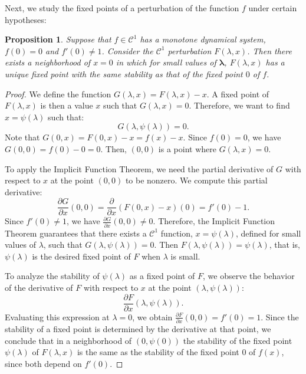 \documentclass[12pt,a4paper]{report}
\newtheorem{proposicion}{Proposition}[section]
\theoremstyle{definition}
\begin{document}
Next, we study the fixed points of a perturbation of the function $f$ under certain hypotheses:

\begin{proposicion}
    
Suppose that $f \in \mathcal{C}^1$ has a monotone dynamical system, $f(0)=0$ and $f'(0) \neq 1$. Consider the $\mathcal{C}^1$ perturbation $F(\lambda,x)$.
Then there exists a neighborhood of $x = 0$ in which for small values of $\mathbf{\lambda}$, $F(\lambda,x)$ has a unique fixed point with the same stability as that of the fixed point $0$ of $f$.

\end{proposicion}

\begin{proof}

We define the function \( G(\lambda, x) = F(\lambda, x) - x \). A fixed point of \( F(\lambda, x) \) is then a value \( x \) such that \( G(\lambda, x) = 0 \). Therefore, we want to find \( x = \psi(\lambda) \) such that:
\[
G(\lambda, \psi(\lambda)) = 0.
\]
Note that \( G(0, x) = F(0, x) - x = f(x) - x \). Since \( f(0) = 0 \), we have \( G(0, 0) = f(0) - 0 = 0 \). Then, \( (0, 0) \) is a point where \( G(\lambda, x) = 0 \).

To apply the Implicit Function Theorem, we need the partial derivative of \( G \) with respect to \( x \) at the point \( (0, 0) \) to be nonzero. We compute this partial derivative:
\[
\frac{\partial G}{\partial x} (0, 0) = \frac{\partial}{\partial x} \left( F(0, x) - x \right)(0)  = f'(0) - 1.
\]
Since \( f'(0) \neq 1 \), we have \( \frac{\partial G}{\partial x} (0, 0) \neq 0 \). Therefore, the Implicit Function Theorem guarantees that there exists a $\mathcal{C}^1$ function, \( x = \psi(\lambda) \), defined for small values of \( \lambda \), such that \( G(\lambda, \psi(\lambda)) = 0 \). Then \( F(\lambda, \psi(\lambda)) = \psi(\lambda) \), that is, \( \psi(\lambda) \) is the desired fixed point of \( F \) when \( \lambda \) is small.

To analyze the stability of \( \psi(\lambda) \) as a fixed point of \( F \), we observe the behavior of the derivative of \( F \) with respect to \( x \) at the point \( (\lambda, \psi(\lambda)) \):
\[
\frac{\partial F}{\partial x} (\lambda, \psi(\lambda)).
\]
Evaluating this expression at \( \lambda = 0 \), we obtain \( \frac{\partial F}{\partial x}(0, 0) = f'(0) = 1 \). Since the stability of a fixed point is determined by the derivative at that point, we conclude that in a neighborhood of $(0,\psi(0))$ the stability of the fixed point \( \psi(\lambda) \) of \( F(\lambda, x) \) is the same as the stability of the fixed point \( 0 \) of \( f(x) \), since both depend on \( f'(0) \).

\end{proof}
\end{document}
